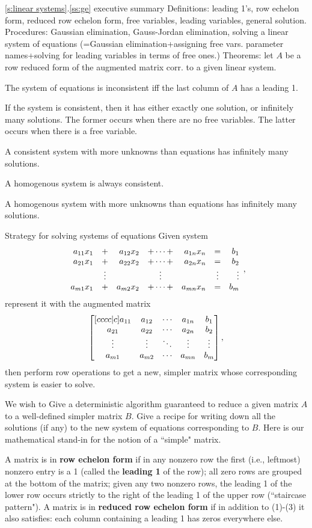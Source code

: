 \begin{frame}{\ref{s:linear systems}.\ref{ss:ge} executive summary}
\footnotesize
\alert{Definitions}: leading 1's, row echelon form, reduced row echelon form, free variables, leading variables, general solution. 
\bspace
\alert{Procedures}: Gaussian elimination, Gauss-Jordan elimination, solving a linear system of equations (=Gaussian elimination+assigning free vars. parameter names+solving for leading variables in terms of free ones.)
\bspace
\alert{Theorems}: let $A$ be a row reduced form of the augmented matrix corr. to a given linear system. 

The system of equations is inconsistent iff the last column of $A$ has a leading 1. 

If the system is consistent, then it has either exactly one solution, or infinitely many solutions. The former occurs when there are no free variables. The latter occurs when there is a free variable. 

A consistent system with more unknowns than equations has infinitely many solutions. 

A homogenous system is always consistent. 

A homogenous system with more unknowns than equations has infinitely many solutions. 



\end{frame}
\begin{frame}{Strategy for solving systems of equations}
Given system 
\[
\begin{array}{rcrcrcr} a_{11}x_{1}&+&a_{12}x_{2}&+\cdots+& a_{1n}x_{n}&=&b_1\\ a_{21}x_{1}&+&a_{22}x_{2}&+\cdots+&a_{2n}x_{n}&=&b_2\\ &\vdots& &\vdots & &\vdots & \vdots\\ a_{m1}x_{1}&+&a_{m2}x_{2}&+\cdots +&a_{mn}x_{n}&=&b_m \end{array},
\]
represent it with the augmented matrix
\[
\begin{bmatrix}[cccc|c] a_{11} & a_{12} & \cdots & a_{1n} &b_{1}\\ a_{21} & a_{22} & \cdots & a_{2n} &b_{2}\\ \vdots & \vdots & \ddots & \vdots &\vdots\\ a_{m1} & a_{m2} & \cdots & a_{mn}&b_{m} \end{bmatrix},
\]
then perform row operations to get a new, simpler matrix whose corresponding system is easier to solve. 
\end{frame}
\begin{frame}\footnotesize
We wish to 
\bb[a]
\ii Give a deterministic algorithm guaranteed to reduce a given matrix $A$ to a well-defined simpler matrix $B$. 
\ii Give a recipe for writing down all the solutions (if any) to the new system of equations corresponding to $B$. 
\ee
\pause Here is our mathematical stand-in for the notion of a ``simple" matrix.
\begin{definition}A matrix is in {\bf row echelon form} if 
\bb
\pause\ii in any nonzero row the first (i.e., leftmost) nonzero entry is a 1 (called the {\bf leading 1} of the row);
\pause\ii all zero rows are grouped at the bottom of the matrix;
\pause\ii given any two nonzero rows, the leading 1 of the lower row occurs strictly to the right of the leading 1 of the upper row (``staircase pattern"). 
\ee 
\pause A matrix is in {\bf reduced row echelon form} if in addition to (1)-(3) it also satisfies:
\bb
\ii[4.] each column containing a leading 1 has zeros everywhere else. 
\ee
\end{definition}
\end{frame}
